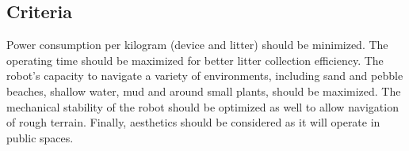 \subsection{Criteria}

Power consumption per kilogram (device and litter) should be minimized.
The operating time should be maximized for better litter collection efficiency.
The robot's capacity to navigate a variety of environments, including sand and pebble beaches, shallow water, mud and around small plants, should be maximized.
The mechanical stability of the robot should be optimized as well to allow navigation of rough terrain.
Finally, aesthetics should be considered as it will operate in public spaces.

\begin{comment}
The following criteria were selected as guides to optimize the design. First, the power consumption per kilogram (device and litter) is to be minimized. Additionally, the operating time of the device is to be maximized for more waste collecting efficiency. 
More specifically to the above required operating terrains, the ability to operate on sandy and pebble beaches as well as shallow water, mud and small plants (foot design, mechanical stability) should be optimized. The range of mobility of the device, such as turning and operating on slopes, is also to be optimized.
Lastly, as the device will operate in public areas, the aesthetic appeal is to be considered.
\end{comment}
